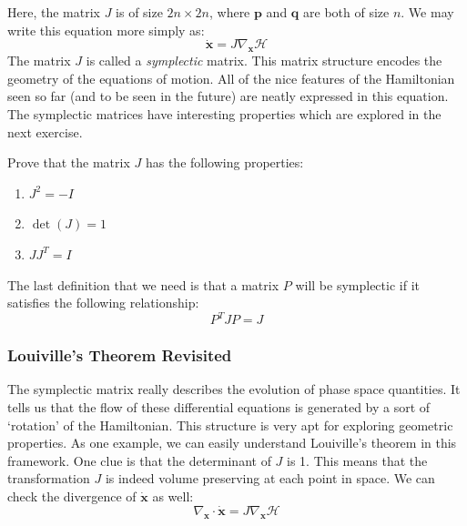 Here, the matrix $J$ is of size $2n\times2n$, where $\bm{p}$ and $\bm{q}$ are both of size $n$. We may write this equation more simply as:
$$\bm{\dot{x}}=J\nabla_{\bm{x}}\mathcal{H}$$
The matrix $J$ is called a \textit{symplectic} matrix. This matrix structure encodes the geometry of the equations of motion. All of the nice features of the \gls{Hamiltonian} seen so far (and to be seen in the future) are neatly expressed in this equation. The symplectic matrices have interesting properties which are explored in the next exercise.
\begin{exercise}
Prove that the matrix $J$ has the following properties:
\begin{enumerate}
    \item $J^2=-I$
    \item $\det(J)=1$
    \item $JJ^T=I$
\end{enumerate}
\end{exercise}

The last definition that we need is that a matrix $P$ will be symplectic if it satisfies the following relationship:
$$P^TJP=J$$
\subsubsection{Louiville's Theorem Revisited}
The symplectic matrix really describes the evolution of phase space quantities. It tells us that the flow of these differential equations is generated by a sort of `rotation' of the Hamiltonian. This structure is very apt for exploring geometric properties. As one example, we can easily understand Louiville's theorem in this framework. One clue is that the determinant of $J$ is 1. This means that the transformation $J$ is indeed volume preserving at each point in space. We can check the divergence of $\bm{\dot{x}}$ as well:
$$\nabla_{\bm{x}}\cdot\bm{\dot{x}}=J\nabla_{\bm{x}}\mathcal{H}$$

